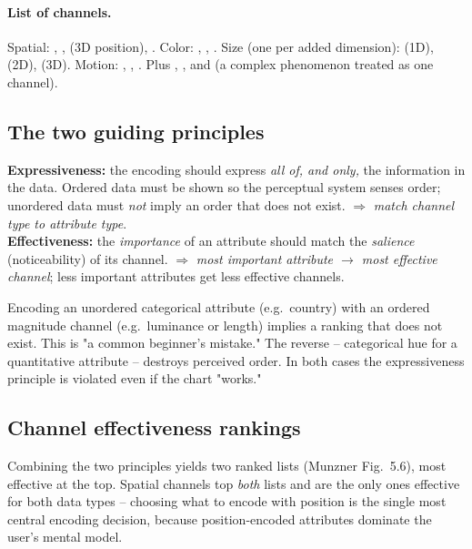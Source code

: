 \paragraph{List of channels.} Spatial: ,
,  (3D position), .
Color: , , . Size (one per added
dimension):  (1D),  (2D),  (3D). Motion:
, , . Plus ,
, and  (a complex phenomenon treated as one channel).

\subsection{The two guiding principles}

\begin{keybox}
\textbf{Expressiveness:} the encoding should express \emph{all of, and only,}
the information in the data. Ordered data must be shown so the perceptual system
senses order; unordered data must \emph{not} imply an order that does not exist.
$\Rightarrow$ \emph{match channel type to attribute type}. \\[3pt]
\textbf{Effectiveness:} the \emph{importance} of an attribute should match the
\emph{salience} (noticeability) of its channel. $\Rightarrow$ \emph{most
important attribute $\to$ most effective channel}; less important attributes get
less effective channels.
\end{keybox}

\begin{pitfall}
Encoding an unordered categorical attribute (e.g.\ country) with an ordered
magnitude channel (e.g.\ luminance or length) implies a ranking that does not
exist. This is "a common beginner's mistake." The reverse -- categorical hue
for a quantitative attribute -- destroys perceived order. In both cases the
expressiveness principle is violated even if the chart "works."
\end{pitfall}

\subsection{Channel effectiveness rankings}

Combining the two principles yields two ranked lists (Munzner Fig.~5.6), most
effective at the top. Spatial channels top \emph{both} lists and are the only
ones effective for both data types -- choosing what to encode with position is
the single most central encoding decision, because position-encoded attributes
dominate the user's mental model.

